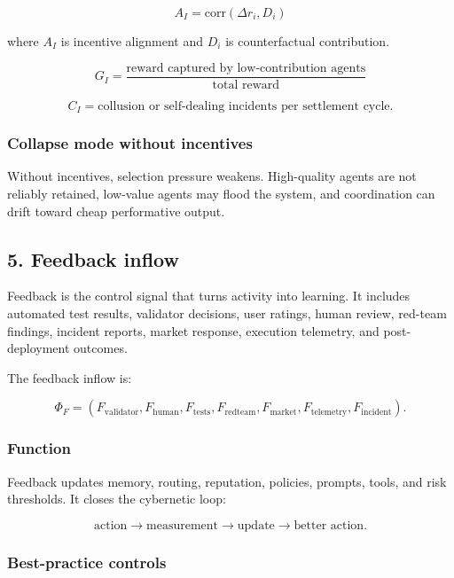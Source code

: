 \documentclass[
  11pt,
]{article}
\begin{document}
\[
A_I=\text{corr}(\Delta r_i,D_i)
\]

where \(A_I\) is incentive alignment and \(D_i\) is counterfactual
contribution.

\[
G_I=\frac{\text{reward captured by low-contribution agents}}{\text{total reward}}
\]

\[
C_I=\text{collusion or self-dealing incidents per settlement cycle}.
\]

\subsubsection{Collapse mode without
incentives}\label{collapse-mode-without-incentives}

Without incentives, selection pressure weakens. High-quality agents are
not reliably retained, low-value agents may flood the system, and
coordination can drift toward cheap performative output.

\subsection{5. Feedback inflow}\label{feedback-inflow}

Feedback is the control signal that turns activity into learning. It
includes automated test results, validator decisions, user ratings,
human review, red-team findings, incident reports, market response,
execution telemetry, and post-deployment outcomes.

The feedback inflow is:

\[
\Phi_F=(F_{\text{validator}},F_{\text{human}},F_{\text{tests}},F_{\text{redteam}},F_{\text{market}},F_{\text{telemetry}},F_{\text{incident}}).
\]

\subsubsection{Function}\label{function-4}

Feedback updates memory, routing, reputation, policies, prompts, tools,
and risk thresholds. It closes the cybernetic loop:

\[
\text{action}\rightarrow\text{measurement}\rightarrow\text{update}\rightarrow\text{better action}.
\]

\subsubsection{Best-practice controls}\label{best-practice-controls-4}
\end{document}
